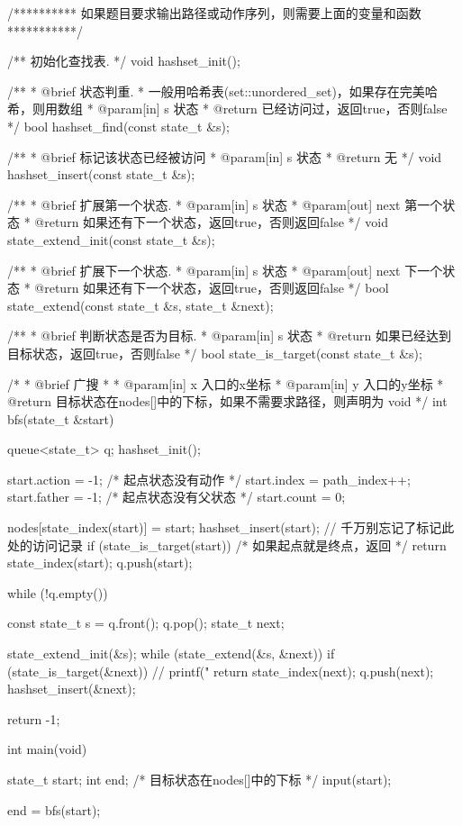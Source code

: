 \begin{Codex}[label=bfs_template2.cpp]
/********** 如果题目要求输出路径或动作序列，则需要上面的变量和函数 ***********/

/** 初始化查找表. */
void hashset_init();

/**
 * @brief 状态判重.
 * 一般用哈希表(set::unordered_set)，如果存在完美哈希，则用数组
 * @param[in] s 状态
 * @return 已经访问过，返回true，否则false
 */
bool hashset_find(const state_t &s);

/**
 * @brief 标记该状态已经被访问
 * @param[in] s 状态
 * @return 无
 */
void hashset_insert(const state_t &s);

/**
 * @brief 扩展第一个状态.
 * @param[in] s 状态
 * @param[out] next 第一个状态
 * @return 如果还有下一个状态，返回true，否则返回false
 */
void state_extend_init(const state_t &s);

/**
 * @brief 扩展下一个状态.
 * @param[in] s 状态
 * @param[out] next 下一个状态
 * @return 如果还有下一个状态，返回true，否则返回false
 */
bool state_extend(const state_t &s, state_t &next);

/**
 * @brief 判断状态是否为目标.
 * @param[in] s 状态
 * @return 如果已经达到目标状态，返回true，否则false
 */
bool state_is_target(const state_t &s);

/*
 * @brief 广搜
 *
 * @param[in] x 入口的x坐标
 * @param[in] y 入口的y坐标
 * @return 目标状态在nodes[]中的下标，如果不需要求路径，则声明为 void
 */
int bfs(state_t &start) {
    queue<state_t> q;
    hashset_init();

    start.action = -1;   /* 起点状态没有动作 */
    start.index = path_index++;
    start.father = -1;   /* 起点状态没有父状态 */
    start.count = 0;

    nodes[state_index(start)] = start;
    hashset_insert(start); // 千万别忘记了标记此处的访问记录
    if (state_is_target(start)) /* 如果起点就是终点，返回 */
        return state_index(start);
    q.push(start);

    while (!q.empty()) {
        const state_t s = q.front(); q.pop();
        state_t next;

        state_extend_init(&s);
        while (state_extend(&s, &next)) {
            if (state_is_target(&next)) {
                // printf("%
                return state_index(next);
            }
            q.push(next);
            hashset_insert(&next);
        }
    }
    return -1;
}

int main(void) {
    state_t start;
    int end; /* 目标状态在nodes[]中的下标 */
    input(start);

    end = bfs(start);

}
\end{Codex}
